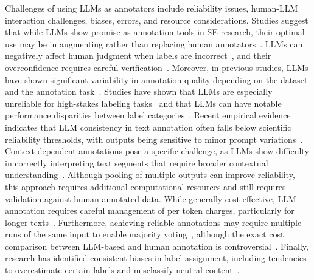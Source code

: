 Challenges of using LLMs as annotators include reliability issues, human-LLM interaction challenges, biases, errors, and resource considerations.
Studies suggest that while LLMs show promise as annotation tools in SE research, their optimal use may be in augmenting rather than replacing human annotators~\cite{DBLP:conf/emnlp/WangLXZZ21, DBLP:conf/chi/HeHDRH24}.
LLMs can negatively affect human judgment when labels are incorrect~\cite{DBLP:conf/www/HuangKA23a}, and their overconfidence requires careful verification~\cite{DBLP:conf/kdd/WanSJKCNSSWYABJ24}.
Moreover, in previous studies, LLMs have shown significant variability in annotation quality depending on the dataset and the annotation task~\cite{DBLP:journals/corr/abs-2306-00176}.
Studies have shown that LLMs are especially unreliable for high-stakes labeling tasks~\cite{DBLP:conf/chi/Wang0RMM24} and that LLMs can have notable performance disparities between label categories~\cite{DBLP:journals/corr/abs-2304-10145}.
Recent empirical evidence indicates that LLM consistency in text annotation often falls below scientific reliability thresholds, with outputs being sensitive to minor prompt variations~\cite{DBLP:journals/corr/abs-2304-11085}.
Context-dependent annotations pose a specific challenge, as LLMs show difficulty in correctly interpreting text segments that require broader contextual understanding~\cite{DBLP:conf/chi/HeHDRH24}.
Although pooling of multiple outputs can improve reliability, this approach requires additional computational resources and still requires validation against human-annotated data.
While generally cost-effective, LLM annotation requires careful management of per token charges, particularly for longer texts~\cite{DBLP:conf/emnlp/WangLXZZ21}. Furthermore, achieving reliable annotations may require multiple runs of the same input to enable majority voting~\cite{DBLP:journals/corr/abs-2304-11085}, although the exact cost comparison between LLM-based and human annotation is controversial~\cite{DBLP:conf/chi/HeHDRH24}.
Finally, research has identified consistent biases in label assignment, including tendencies to overestimate certain labels and misclassify neutral content~\cite{DBLP:journals/corr/abs-2304-10145}.